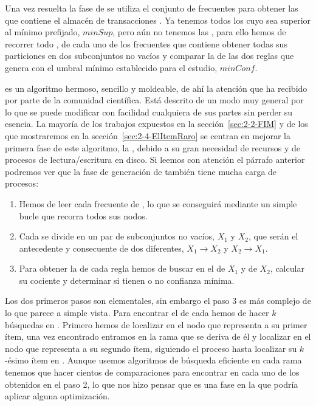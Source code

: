 Una vez resuelta la fase de \fim se utiliza el conjunto \aprioriL de \itemsets frecuentes para obtener las \ARs que contiene el almacén de transacciones \D. Ya tenemos todos los \itemsets cuyo \soporte sea superior al mínimo prefijado, $minSup$, pero aún no tenemos las \ARs, para ello hemos de recorrer todo \aprioriL, de cada uno de los \itemsets frecuentes que contiene obtener todas sus particiones en dos subconjuntos no vacíos y comparar la \confianza de las dos reglas que genera con el umbral mínimo establecido para el estudio, $minConf$.

\apriori es un algoritmo hermoso, sencillo y moldeable, de ahí la atención que ha recibido por parte de la comunidad científica. Está descrito de un modo muy general por lo que se puede modificar con facilidad cualquiera de sus partes sin perder su esencia. La mayoría de los trabajos expuestos en la sección~\ref{sec:2-2-FIM} y de los que mostraremos en la sección~\ref{sec:2-4-ElItemRaro} se centran en mejorar la primera fase de este algoritmo, la \fim, debido a su gran necesidad de recursos y de procesos de lectura/escritura en disco. Si leemos con atención el párrafo anterior podremos ver que la fase de generación de \ars también tiene mucha carga de procesos:

\begin{enumerate}
  \item Hemos de leer cada \itemset frecuente de \aprioriL, lo que se conseguirá mediante un simple bucle que recorra todos sus nodos.
  \item Cada \itemset se divide en un par de subconjuntos no vacíos, $X_1$ y $X_2$, que serán el antecedente y consecuente de dos \ARs diferentes, $X_1 \rightarrow X_2$ y $X_2 \rightarrow X_1$.
  \item Para obtener la \confianza de cada regla hemos de buscar en \aprioriL el \soporte de $X_1$ y de $X_2$, calcular su cociente y determinar si tienen o no confianza mínima.
\end{enumerate}

Los dos primeros pasos son elementales, sin embargo el paso 3 es más complejo de lo que parece a simple vista. Para encontrar el \soporte de cada \kitemset hemos de hacer $k$ búsquedas en \aprioriL. Primero hemos de localizar en \aprioriL[1] el nodo que representa a su primer ítem, una vez encontrado entramos en la rama que se deriva de él y localizar en \aprioriL[2] el nodo que representa a su segundo ítem, siguiendo el proceso hasta localizar su $k$-ésimo ítem en \aprioriL[k]. Aunque usemos algoritmos de búsqueda eficiente en cada rama tenemos que hacer cientos de comparaciones para encontrar en \aprioriL cada uno de los \itemsets obtenidos en el paso 2, lo que nos hizo pensar que es una fase en la que podría aplicar alguna optimización.









